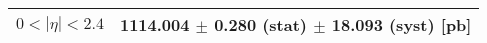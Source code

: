 \begin{tabular}{lc}
\hline
\hline
$0 < |\eta| <2.4$              & 1114.004 $\pm$ 0.280 (stat) $\pm$ 18.093 (syst) [pb]  \\
\hline
\hline
\end{tabular}
